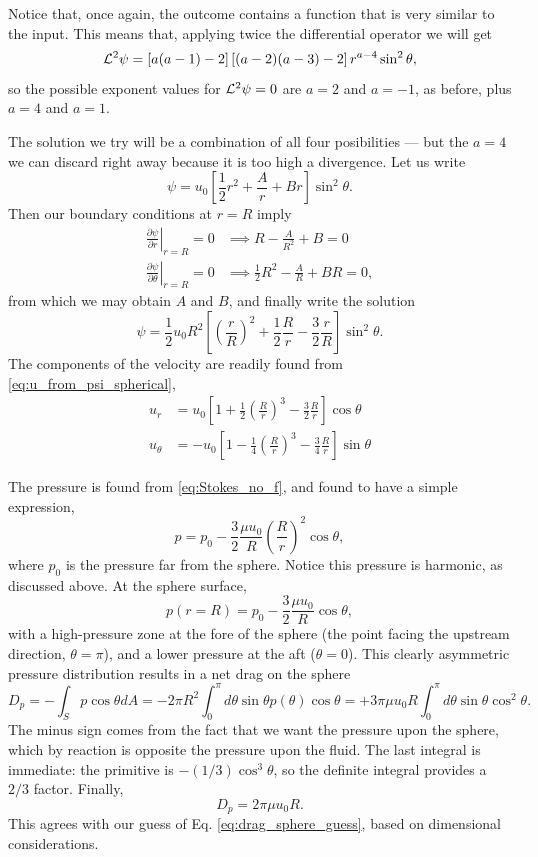 Notice that, once again, the outcome contains a function that is very
similar to the input. This means that, applying twice the differential
operator we will get
\[
  {\cal L}^2 \psi =
  \left[   a  (a-1) - 2 \right]
  \left[ (a-2)(a-3) - 2 \right]
  r^{a-4} \sin^2\theta ,
\]
so  the possible exponent values for ${\cal L}^2 \psi = 0$ are $a=2$ and
$a=-1$, as before, plus $a=4$ and $a=1$.

The solution we try will be a combination of all four posibilities --- but
the $a=4$ we can discard right away because it is too high a divergence. Let
us write
\[
  \psi = u_0 \left[ \frac12 r^2 + \frac{A}{r} + B r \right] \sin^2\theta .
\]
Then our boundary conditions at $r=R$ imply
\begin{align*}
  \left.\frac{\partial \psi}{\partial r}\right|_{r=R} = 0 &\implies
                                                            R-\frac{A}{R^2} + B  =0 \\
  \left.\frac{\partial \psi}{\partial \theta}\right|_{r=R} = 0 &\implies
                                                            \frac12 R^2-\frac{A}{R} + BR  =0 ,
\end{align*}
from which we may obtain $A$ and $B$, and finally write the solution
\[
  \psi = \frac12 u_0 R^2
  \left[\left(  \frac{r}{R} \right)^2
    + \frac12 \frac{R}{r} - \frac32 \frac{r}{R} \right] \sin^2\theta .
\]
The components of the velocity are readily found from
\ref{eq:u_from_psi_spherical},
\begin{equation*}
  \begin{split}
    u_r     &=  u_0  \left[
      1+ \frac12 \left(\frac{R}{r}\right)^3 - \frac32 \frac{R}{r}
    \right] \cos \theta \\
    u_\theta &=
    - u_0  \left[
      1
      - \frac14 \left(\frac{R}{r}\right)^3 - \frac34 \frac{R}{r}
    \right] \sin \theta
  \end{split}
\end{equation*}

The pressure is found from \ref{eq:Stokes_no_f}, and found to have a
simple expression,
\[
  p=p_0 - \frac32 \frac{\mu u_0}{R} \left(\frac{R}{r}\right)^2
  \cos\theta ,
\]
where $p_0$ is the pressure far from the sphere. Notice this pressure
is harmonic, as discussed above. At the sphere surface,
\[
  p(r=R) = p_0 - \frac32 \frac{\mu u_0}{R} \cos\theta,
\]
with a high-pressure zone at the fore of the sphere (the point facing
the upstream direction, $\theta=\pi$), and a lower pressure at the aft
($\theta=0$). This clearly asymmetric pressure distribution results in
a net drag on the sphere
\[
  D_p=  - \int_S  p \cos\theta dA =
  -2\pi R^2 \int_0^\pi d\theta \sin\theta  p(\theta) \cos\theta =
  + 3 \pi \mu u_0 R \int_0^\pi d\theta \sin\theta  \cos^2\theta .
\]
The minus sign comes from the fact that we want the pressure upon the
sphere, which by reaction is opposite the pressure upon the fluid.
The last integral is immediate: the primitive is $-(1/3)\cos^3\theta$,
so the definite integral provides a $2/3$ factor. Finally,
\[
  D_p=  2 \pi \mu u_0 R .
\]
This agrees with our guess of Eq. \ref{eq:drag_sphere_guess}, based on
dimensional considerations.

